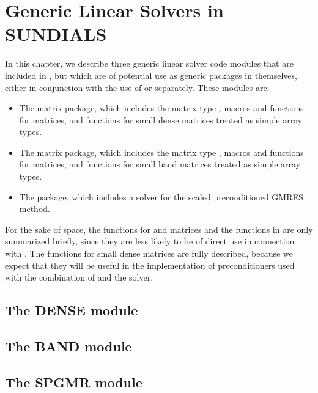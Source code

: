 \chapter{Generic Linear Solvers in SUNDIALS}\label{s:gen_linsolv}
In this chapter, we describe three generic linear solver code modules that 
are included in {\cvode}, but which are of potential use as generic packages in
themselves, either in conjunction with the use of {\cvode} or separately.
These modules are:
\begin{itemize}
\item The {\dense} matrix package, which includes the matrix type ,
      macros and functions for  matrices, and functions
      for small dense matrices treated as simple array types.
\item The {\band} matrix package, which includes the matrix type ,
      macros and functions for  matrices, and functions
      for small band matrices treated as simple array types.
\item The {\spgmr} package, which includes a solver for the scaled
      preconditioned GMRES method.
\end{itemize}

For the sake of space, the functions for  and
 matrices and the functions in {\spgmr} are only summarized
briefly, since they are less likely to be of direct use in connection
with {\cvode}.  The functions for small dense matrices are fully
described, because we expect that they will be useful in the
implementation of preconditioners used with the combination of {\cvode}
and the {\cvspgmr} solver.

\section{The DENSE module}\label{ss:dense}


\section{The BAND module}\label{ss:band}


\section{The SPGMR module}\label{ss:spgmr}


